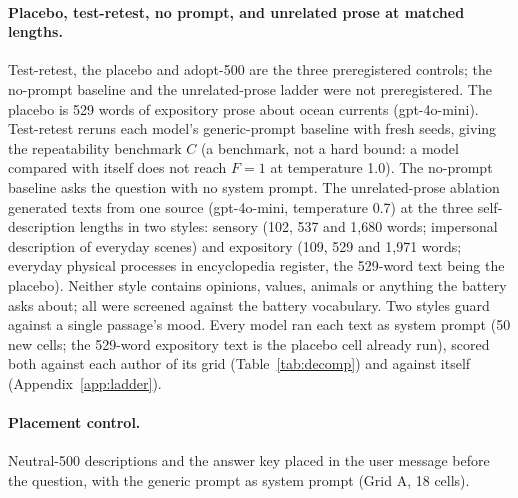 \documentclass[11pt]{article}
\begin{document}
\paragraph{Placebo, test-retest, no prompt, and unrelated prose at matched
lengths.} Test-retest, the placebo and adopt-500 are the three
preregistered controls; the no-prompt baseline and the
unrelated-prose ladder were not preregistered. The placebo is 529 words of
expository prose about ocean currents
(gpt-4o-mini). Test-retest reruns each model's generic-prompt baseline with
fresh seeds, giving the repeatability benchmark $C$ (a benchmark, not a hard
bound: a model compared with itself does not reach $F=1$ at temperature
1.0). The no-prompt baseline asks the question with no system prompt. The
unrelated-prose ablation generated texts from one source (gpt-4o-mini,
temperature 0.7) at the three self-description lengths in two styles:
sensory (102, 537 and 1{,}680 words; impersonal description of everyday
scenes) and expository (109, 529 and 1{,}971 words; everyday physical
processes in encyclopedia register, the 529-word text being the placebo).
Neither style contains opinions, values, animals or anything the battery
asks about; all were screened against the battery vocabulary. Two styles
guard against a single passage's mood. Every model ran each text as system
prompt (50 new cells; the 529-word expository text is the placebo cell
already run), scored both against each author of its grid
(Table~\ref{tab:decomp}) and against itself (Appendix~\ref{app:ladder}).

\paragraph{Placement control.} Neutral-500 descriptions and the answer key
placed in the user message before the question, with the generic prompt as
system prompt (Grid A, 18 cells).
\end{document}
